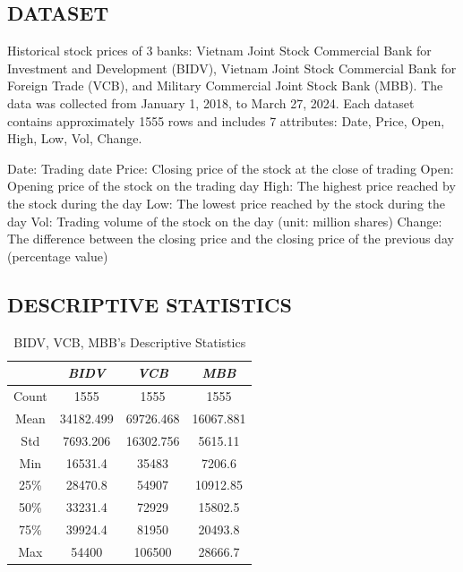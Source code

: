 \documentclass[conference]{IEEEtran}
\begin{document}
\subsection{DATASET}
Historical stock prices of 3 banks: Vietnam Joint Stock Commercial Bank for Investment and Development (BIDV), Vietnam Joint Stock Commercial Bank for Foreign Trade (VCB), and Military Commercial Joint Stock Bank (MBB). The data was collected from January 1, 2018, to March 27, 2024. Each dataset contains approximately 1555 rows and includes 7 attributes: Date, Price, Open, High, Low, Vol, Change.

Date: Trading date
Price: Closing price of the stock at the close of trading
Open: Opening price of the stock on the trading day
High: The highest price reached by the stock during the day
Low: The lowest price reached by the stock during the day
Vol: Trading volume of the stock on the day (unit: million shares)
Change: The difference between the closing price and the closing price of the previous day (percentage value)

\subsection{DESCRIPTIVE STATISTICS}
\begin{table}[htbp]
\caption{BIDV, VCB, MBB’s Descriptive Statistics}
\begin{center}
\begin{tabular}{|c|c|c|c|}
\hline
\textbf{} & \textbf{\textit{BIDV}} & \textbf{\textit{VCB}} & \textbf{\textit{MBB}} \\
\hline
Count & 1555 & 1555 & 1555 \\
\hline
Mean & 34182.499 & 69726.468 & 16067.881 \\
\hline
Std & 7693.206 & 16302.756 & 5615.11 \\
\hline
Min & 16531.4 & 35483 & 7206.6 \\
\hline
25\% & 28470.8 & 54907 & 10912.85 \\
\hline
50\% & 33231.4 & 72929 & 15802.5 \\
\hline
75\% & 39924.4 & 81950 & 20493.8 \\
\hline
Max & 54400 & 106500 & 28666.7 \\
\hline
\end{tabular}
\label{tab1}
\end{center}
\end{table}
\end{document}
